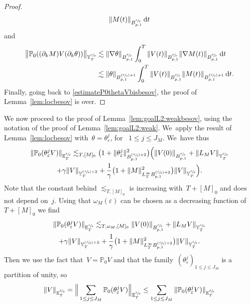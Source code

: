 \documentclass[JEP,XML,SOM,Unicode,published]{cedram}
\newcommand{\Psfrac}[2]{(\sfrac{#1}{#2})}
\theoremstyle{definition}
\newcommand\dd{\mathrm{d}}
\let\ep\varepsilon
\begin{document}
\begin{proof}
\[\begin{aligned}
\|M(t)\| _{ B^{\sfrac dp}_{p,1}} \, \dd t
\end{aligned}
\]
and
\[
\begin{aligned}
\big \| \mathbb{P}_0((\partial_k M) V(\partial_k\theta)) \big\|_{{\mathbb Y}^{\sfrac dp}_T } & \lesssim \|\nabla \theta\|_{ B^{\sfrac dp}_{p,1} } \int_0^T \| V(t)\|_{B^{\sfrac dp}_{p,1}}
\|\nabla M(t)\| _{ B^{\sfrac dp}_{p,1}} \, \dd t \\
& \lesssim \| \theta\|_{ B^{\Psfrac dp+1}_{p,1} } \int_0^T \| V(t)\|_{B^{\sfrac dp}_{p,1}}
\| M(t)\| _{ B^{\Psfrac dp+1}_{p,1}} \, \dd t.
\end{aligned}
\]
Finally, going back to \eqref{estimateP0thetaVbisbesov}, the proof of Lemma~\ref{lem:locbesov} is over.
\end{proof}

We now proceed to the proof of Lemma~\ref{lem:goalL2:weakbesov}, using the notation of the proof of Lemma~\ref{lem:goalL2:weak}. We~apply the result of Lemma~\ref{lem:locbesov} with~$\theta = \theta^{j}_\ep $, for ~$1 \leq j \leq J_M$. We~have thus
\begin{multline*}
\|\mathbb{P}_0(\theta^{j}_\ep V)\|_{{\mathbb E}^{\sfrac dp}_T} \lesssim_{T,[M]_0} \bigl(1+ \| \theta^{j}_\ep \|^2_{B^{\Psfrac dp+2}_{p,1}} \bigr)\Bigl(\| V (0)\|_{B^{\sfrac dp}_{p,1}} + \| L_{M }V\|_{{\mathbb Y}^{\sfrac dp}_T} \\+ \gamma \|V\|_{{{\mathbb Y}^{\Psfrac dp+2}_T }} +\frac 1 \gamma\bigl(1+ \|M\|^2_{{L^\infty_T B^{\Psfrac dp+2}_{p,1} }} \bigr) \| V \|_{{\mathbb Y}^{\sfrac dp}_T} \Bigr).
\end{multline*}
Note that the constant behind $\lesssim_{T,[M]_0}$ is increasing with~$T+[M]_0 $ and does not depend on~$j$. Using that $\omega_M(\ep)$ can be chosen as a decreasing function of~$T+[M]_0 $ we find
\begin{multline*}
\|\mathbb{P}_0(\theta^{j}_\ep V)\|_{{\mathbb E}^{\sfrac dp}_T} \lesssim_{T,\omega_M,[M]_0} \| V (0)\|_{B^{\sfrac dp}_{p,1}} + \| L_{M }V\|_{{\mathbb Y}^{\sfrac dp}_T} \\+ \gamma \|V\|_{{{\mathbb Y}^{\Psfrac dp+2}_T }} + \frac1\gamma\bigl(1+ \|M\|^2_{{L^\infty_T B^{\Psfrac dp+2}_{p,1} }} \bigr) \| V \|_{{\mathbb Y}^{\sfrac dp}_T}.
\end{multline*}
Then we use the fact that~$V = \mathbb{P}_0 V$ and that the family~$(\theta^{j}_\ep)_{1 \leq j \leq J_M}$ is a partition of unity, so
\[
\|V\|_{{\mathbb E}^{\sfrac dp}_T} = \Big \| \sum_{1 \leq j \leq J_M} \mathbb{P}_0 (\theta^{j}_\ep V)\Big\| _{{\mathbb E}^{\sfrac dp}_T} \leq \sum_{1 \leq j \leq J_M} \| \mathbb{P}_0 (\theta^{j}_\ep V)\| _{{\mathbb E}^{\sfrac dp}_T}
\]
\end{document}
